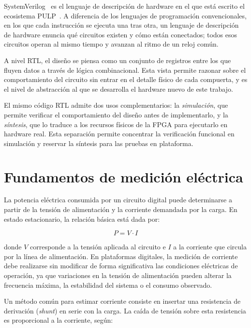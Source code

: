 SystemVerilog~\cite{ieee1800sv} es el lenguaje de descripción de hardware en
el que está escrito el ecosistema PULP~\cite{pulpissimo}. A diferencia de los
lenguajes de programación convencionales, en los que cada instrucción se
ejecuta una tras otra, un lenguaje de descripción de hardware enuncia qué
circuitos existen y cómo están conectados; todos esos circuitos operan al mismo
tiempo y avanzan al ritmo de un reloj común.

A nivel RTL, el diseño se piensa como un conjunto de registros entre los que
fluyen datos a través de lógica combinacional. Esta vista permite razonar sobre
el comportamiento del circuito sin entrar en el detalle físico de cada
compuerta, y es el nivel de abstracción al que se desarrolla el hardware nuevo
de este trabajo.

El mismo código RTL admite dos usos complementarios: la \emph{simulación}, que
permite verificar el comportamiento del diseño antes de implementarlo, y la
\emph{síntesis}, que lo traduce a los recursos físicos de la FPGA para
ejecutarlo en hardware real. Esta separación permite concentrar la verificación
funcional en simulación y reservar la síntesis para las pruebas en plataforma.

\section{Fundamentos de medición eléctrica}
\label{sec:medicion}

La potencia eléctrica consumida por un circuito digital puede determinarse a
partir de la tensión de alimentación y la corriente demandada por la carga. En
estado estacionario, la relación básica está dada por:

\begin{equation}
    P = V \cdot I
    \label{eq:potencia_vi}
\end{equation}

donde $V$ corresponde a la tensión aplicada al circuito e $I$ a la corriente que
circula por la línea de alimentación. En plataformas digitales, la medición de
corriente debe realizarse sin modificar de forma significativa las condiciones
eléctricas de operación, ya que variaciones en la tensión de alimentación pueden
alterar la frecuencia máxima, la estabilidad del sistema o el consumo observado.

Un método común para estimar corriente consiste en insertar una resistencia de
derivación (\emph{shunt}) en serie con la carga. La caída de tensión sobre esta
resistencia es proporcional a la corriente, según:

